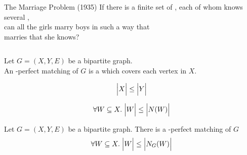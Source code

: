
\begin{frame}
\end{frame}

\begin{frame}{}
  \begin{exampleblock}{The Marriage Problem (1935)}
    If there is a finite set of ,
    each of whom knows several , \\[3pt]
     can all the girls marry boys in such a way that \\[3pt]
     marries  that she knows?
  \end{exampleblock}

  \pause
  \begin{center}
  \end{center}
\end{frame}

\begin{frame}{}
  \begin{columns}
  \end{columns}

  \pause
  \vspace{0.30cm}
  \begin{definition}
    Let $G = (X, Y, E)$ be a bipartite graph. \\[3pt]
    An -perfect matching of $G$ is a 
    which covers each vertex in $X$.
  \end{definition}
\end{frame}

\begin{frame}{}
  \[
    \Big\lvert X \Big\rvert \le \Big\lvert Y \Big\rvert
  \]

  \pause
  \[
    \forall W \subseteq X.\; \Big\lvert W \Big\rvert \le \Big\lvert N(W) \Big\rvert
  \]
\end{frame}

\begin{frame}{}
  \begin{theorem}
    Let $G = (X, Y, E)$ be a bipartite graph.
    There is a -perfect matching of $G$ 
    \[
      \forall W \subseteq X.\; \Big\lvert W \Big\rvert \le \Big\lvert N_{G}(W) \Big\rvert
    \]
  \end{theorem}
\end{frame}

